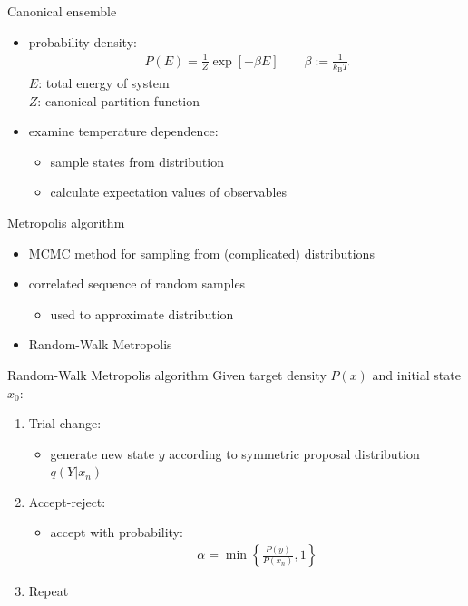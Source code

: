 \documentclass[mathserif,serif]{beamer}
\begin{document}
\begin{frame}{Canonical ensemble}
	\begin{itemize}
		\setlength\itemsep{2.0em}
		\item probability density:
		\begin{align*}
			P(E) = \frac{1}{Z} \exp\left[ - \beta E \right] \qquad \beta := \frac{1}{k_\mathrm{B} T}
		\end{align*}
		$E$: total energy of system\\
		$Z$: canonical partition function
		
		\item examine temperature dependence:
		\begin{itemize}
			\item sample states from distribution
			\item calculate expectation values of observables
		\end{itemize}
	\end{itemize}
\end{frame}

\begin{frame}{Metropolis algorithm}
	\begin{itemize}
		\setlength\itemsep{1.5em}
		\item MCMC method for sampling from (complicated) distributions
		\item correlated sequence of random samples
		\begin{itemize}
			\item used to approximate distribution
		\end{itemize}
		\item Random-Walk Metropolis
	\end{itemize}

\end{frame}

\begin{frame}{Random-Walk Metropolis algorithm}
	Given target density $P(x)$ and initial state $x_0$:
	\vspace*{0.2cm}
	\begin{enumerate}
		\setlength{\itemsep}{1.5em}
		\item Trial change:
		\begin{itemize}
			\item generate new state $y$ according to symmetric proposal distribution $q(Y|x_n)$
		\end{itemize}
		
		\item Accept-reject:
		\begin{itemize}
			\item accept with probability:
			\begin{align*}
				\alpha = \min\left\{ \frac{P(y)}{P(x_n)}, 1 \right\}
			\end{align*}
		\end{itemize}
		
		\item Repeat
	\end{enumerate}		
\end{frame}
\end{document}

